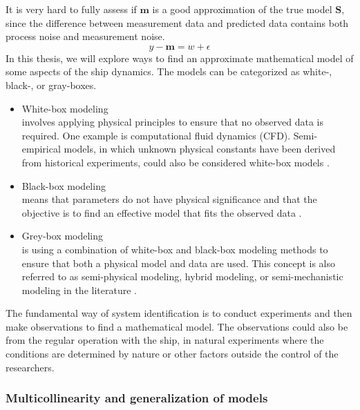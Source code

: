 It is very hard to fully assess if $\mathbf{m}$ is a good approximation of the true model $\mathbf{S}$, since the difference between measurement data and predicted data contains both process noise and measurement noise.
$$
y - \mathbf{m} = w + \epsilon
$$
In this thesis, we will explore ways to find an approximate mathematical model of some aspects of the ship dynamics. The models can be categorized as white-, black-, or gray-boxes. 
\vspace{5pt}
\begin{itemize}
    \setlength\itemsep{5pt}
    \item White-box modeling \\
    involves applying physical principles to ensure that no observed data is required. One example is computational fluid dynamics (CFD). Semi-empirical models, in which unknown physical constants have been derived from historical experiments, could also be considered white-box models \cite{leifsson_grey-box_2008}.  

    \item Black-box modeling \\
    means that parameters do not have physical significance and that the objective is to find an effective model that fits the observed data \cite{lindskog_tools_1995}.
    
    \item Grey-box modeling \\
    is using a combination of white-box and black-box modeling methods to ensure that both a physical model and data are used. This concept is also referred to as semi-physical modeling, hybrid modeling, or semi-mechanistic modeling in the literature \cite{leifsson_grey-box_2008}. 
\end{itemize}
\vspace{5pt}
The fundamental way of system identification is to conduct experiments and then make observations to find a mathematical model. 
The observations could also be from the regular operation with the ship, in natural experiments where the conditions are determined by nature or other factors outside the control of the researchers.

\subsubsection{Multicollinearity and generalization of models} \label{sec:multicollinearity}

